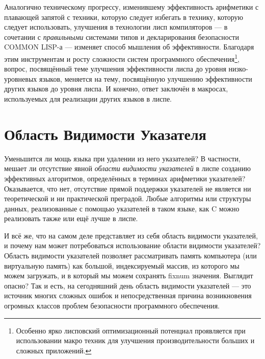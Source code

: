 Аналогично техническому прогрессу, изменившему эффективность арифметики с плавающей запятой с техники, которую следует избегать в технику, которую следует использовать, улучшения в технологии лисп компиляторов --- в сочетании с \emph{правильными} системами типов и декларирования безопасности COMMON LISP-а --- изменяет способ мышления об эффективности. Благодаря этим инструментам и росту сложности систем программного обеспечения\footnote{Особенно ярко лисповский оптимизационный потенциал проявляется при использовании макро техник для улучшения производительности больших и сложных приложений.}, вопрос, посвящённый теме улучшения эффективности лиспа до уровня низко-уровневых языков, меняется на тему, посвящённую улучшению эффективности других языков до уровня лиспа. И конечно, ответ заключён в макросах, используемых для реализации других языков в лиспе.

\section{Область Видимости Указателя}\label{section_pointer_scope}

Уменьшится ли мощь языка при удалении из него указателей? В частности, мешает ли отсутствие явной \emph{области видимости указателей} в лиспе созданию эффективных алгоритмов, определённых в терминах арифметики указателей? Оказывается, что нет, отсутствие прямой поддержки указателей не является ни теоретической и ни практической преградой. Любые алгоритмы или структуры данных, реализованные с помощью указателей в таком языке, как C можно реализовать также или ещё лучше в лиспе.

И всё же, что на самом деле представляет из себя область видимости указателей, и почему нам может потребоваться использование области видимости указателей? Область видимости указателей позволяет рассматривать память компьютера (или виртуальную память) как большой, индексируемый массив, из которого мы можем загружать, и в который мы можем сохранять fixnum значения. Выглядит опасно? Так и есть, на сегодняшний день область видимости указателей --- это источник многих сложных ошибок и непосредственная причина возникновения огромных классов проблем безопасности программного обеспечения.

